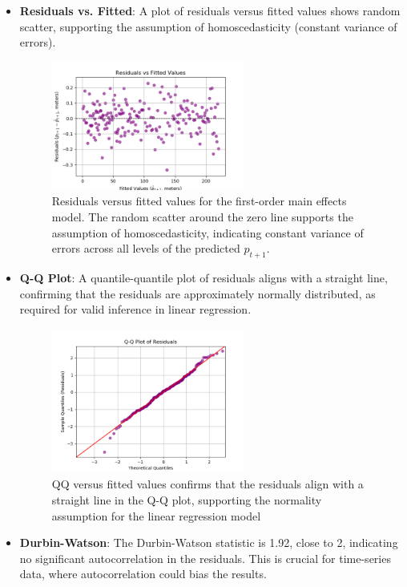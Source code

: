 \documentclass[12pt]{article}
\begin{document}
\begin{itemize}
    \item \textbf{Residuals vs. Fitted}: A plot of residuals versus fitted values shows random scatter, supporting the assumption of homoscedasticity (constant variance of errors).

\begin{figure}[h]
    \centering
    \includegraphics[width=0.6\textwidth]{residuals_vs_fitted.png}
    \caption{Residuals versus fitted values for the first-order main effects model. The random scatter around the zero line supports the assumption of homoscedasticity, indicating constant variance of errors across all levels of the predicted \( p_{t+1} \).}
    \label{fig:residuals_vs_fitted}
\end{figure}
\newpage
    \item \textbf{Q-Q Plot}: A quantile-quantile plot of residuals aligns with a straight line, confirming that the residuals are approximately normally distributed, as required for valid inference in linear regression.

\begin{figure}[h]
    \centering
    \includegraphics[width=0.6\textwidth]{qq_plot_residuals.png}
    \caption{QQ versus fitted values confirms that the residuals align with a straight line in the Q-Q plot, supporting the normality assumption for the linear regression model}
    \label{fig:qq_vs_residuals}
\end{figure}


    \item \textbf{Durbin-Watson}: The Durbin-Watson statistic is 1.92, close to 2, indicating no significant autocorrelation in the residuals. This is crucial for time-series data, where autocorrelation could bias the results.
\end{itemize}
\end{document}
